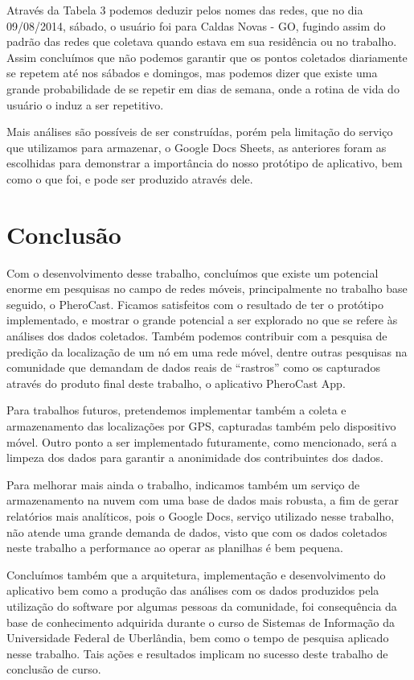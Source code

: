 \documentclass[12pt, %
openright, 
oneside,
a4paper,
brazil]{facom-ufu-abntex2}
\begin{document}
Através da Tabela 3 podemos deduzir pelos nomes das redes, que no dia 09/08/2014, sábado, o usuário foi para Caldas Novas - GO, fugindo assim do padrão das redes que coletava quando estava em sua residência ou no trabalho. Assim concluímos que não podemos garantir que os pontos coletados diariamente se repetem até nos sábados e domingos, mas podemos dizer que existe uma grande probabilidade de se repetir em dias de semana, onde a rotina de vida do usuário o induz a ser repetitivo.


Mais análises são possíveis de ser construídas, porém pela limitação do serviço que utilizamos para armazenar, o Google Docs Sheets, as anteriores foram as escolhidas para demonstrar a importância do nosso protótipo de aplicativo, bem como o que foi, e pode ser produzido através dele.



\chapter{Conclusão}


Com o desenvolvimento desse trabalho, concluímos que existe um potencial enorme em pesquisas no campo de redes móveis, principalmente no trabalho base seguido, o PheroCast. Ficamos satisfeitos com o resultado de ter o protótipo implementado, e mostrar o grande potencial a ser explorado no que se refere às análises dos dados coletados. Também podemos contribuir com a pesquisa de predição da localização de um nó em uma rede móvel, dentre outras pesquisas na comunidade que demandam de dados reais de ``rastros'' como os capturados através do produto final deste trabalho, o aplicativo PheroCast App.


Para trabalhos futuros, pretendemos implementar também a coleta e armazenamento das localizações por GPS, capturadas também pelo dispositivo móvel. Outro ponto a ser implementado futuramente, como mencionado, será a limpeza dos dados para garantir a anonimidade dos contribuintes dos dados.

Para melhorar mais ainda o trabalho, indicamos também um serviço de armazenamento na nuvem com uma base de dados mais robusta, a fim de gerar relatórios mais analíticos, pois o Google Docs, serviço utilizado nesse trabalho, não atende uma grande demanda de dados, visto que com os dados coletados neste trabalho a performance ao operar as planilhas é bem pequena. 

Concluímos também que a arquitetura, implementação e desenvolvimento do aplicativo bem como a produção das análises com os dados produzidos pela utilização do software por algumas pessoas da comunidade, foi consequência da base de conhecimento adquirida durante o curso de Sistemas de Informação da Universidade Federal de Uberlândia, bem como o tempo de pesquisa aplicado nesse trabalho. Tais ações e resultados implicam no sucesso deste trabalho de conclusão de curso.
\end{document}
